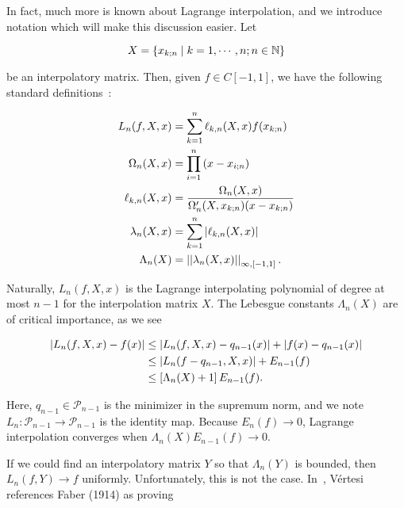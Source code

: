 

In fact, much more is known about Lagrange interpolation,
and we introduce notation which will make this discussion easier.
Let

\begin{equation}
    X = \left\{ x_{k;n} \mid k=1,\cdots,n; n\in\mathbb{N} \right\}
\end{equation}

\noindent
be an interpolatory matrix. Then, given $f\in C[-1,1]$,
we have the following standard
definitions~\cite[Chapter 1]{interpFunctionsBook}:

\begin{samepage}
\begin{align}
    L_{n}(f,X,x) &= \sum_{k=1}^{n}\ell_{k,n}(X,x)f(x_{k;n}) \nonumber\\
    \Omega_{n}(X,x) &= \prod_{i=1}^{n}\left( x-x_{i;n} \right)
        \nonumber\\
    \ell_{k,n}(X,x) &= \frac{\Omega_{n}(X,x)}{\Omega_{n}'(X,x_{k;n})(x-x_{k;n})}
        \nonumber\\
    \lambda_{n}(X,x) &= \sum_{k=1}^{n}\left| \ell_{k,n}(X,x) \right| \nonumber\\
    \Lambda_{n}(X) &= \left| \left| \lambda_{n}(X,x) \right| \right|_{\infty,[-1,1]}.
\end{align}
\end{samepage}

\noindent
Naturally, $L_{n}(f,X,x)$ is the Lagrange interpolating polynomial
of degree at most $n-1$ for the interpolation matrix $X$.
The Lebesgue constants $\Lambda_{n}(X)$ are of
critical importance, as we see

\begin{align}
    \left| L_{n}(f,X,x) - f(x) \right| &\le \left| L_{n}(f,X,x) - q_{n-1}(x) \right|
            + \left| f(x) - q_{n-1}(x) \right| \nonumber\\
    &\le \left| L_{n}(f-q_{n-1},X,x) \right| + E_{n-1}(f) \nonumber\\
    &\le \left[ \Lambda_{n}(X)+1 \right]E_{n-1}(f).
    \label{eq:Ln_upper_bound_err}
\end{align}

\noindent
Here, $q_{n-1}\in\mathcal{P}_{n-1}$ is the minimizer in the supremum norm,
and we note $L_{n}:\mathcal{P}_{n-1}\to\mathcal{P}_{n-1}$ is the identity map.
Because $E_{n}(f)\to0$, Lagrange interpolation converges when
$\Lambda_{n}(X)E_{n-1}(f)\to0$.

If we could find an interpolatory matrix $Y$ so that $\Lambda_{n}(Y)$ is
bounded, then $L_{n}(f,Y)\to f$ uniformly. Unfortunately, this is not
the case. In~\cite{vertesi1990optimal}, V\'{e}rtesi references Faber (1914)
as proving

